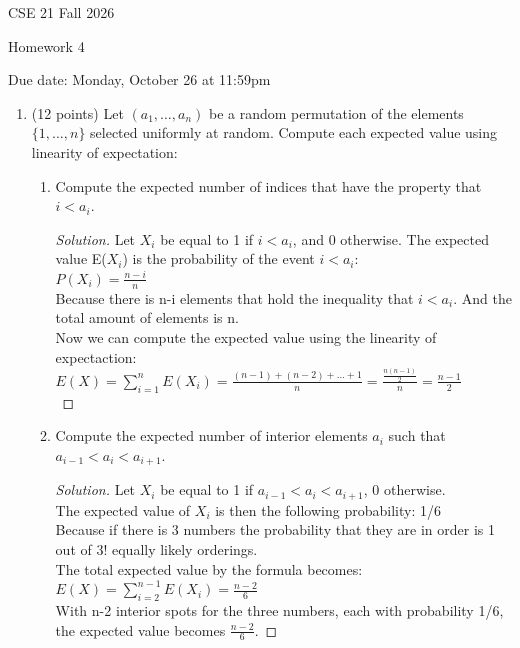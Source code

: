 \documentclass[10pt,letterpaper,unboxed,cm]{article}
\newenvironment{solution}
  {\begin{proof}[Solution]}
  {\end{proof}}
\begin{document}
\hfill{CSE 21 Fall 2026}

\hfill{Homework 4}

\hfill{Due date: Monday, October 26 at 11:59pm}



\begin{enumerate}
\item (12 points)
Let $(a_1,\dots,a_n)$ be a random permutation of the elements $\{1,\dots,n\}$ selected uniformly at random. Compute each expected value using linearity of expectation:


\begin{enumerate}
\item
Compute the expected number of indices that have the property that $i<a_i$.

\begin{solution}
    Let $X_i$ be equal to 1 if $i < a_i$, and 0 otherwise. 
    The expected value E($X_i$) is the probability of the event $i < a_i$:\\
    \(P(X_i)=\frac{n-i}{n}\) \\
    Because there is n-i elements that hold the inequality that $i < a_i$. And the total amount of elements is n.\\
    Now we can compute the expected value using the linearity of expectaction:\\
    \(E(X) = \sum_{i=1}^{n} E(X_i) = \frac{(n-1)+(n-2)+\dots+1}{n} = \frac{\frac{n(n-1)}{2}}{n} = \boxed{\frac{n-1}{2}}\)\\
\end{solution}
\item
Compute the expected number of interior elements $a_i$ such that $a_{i-1}<a_i<a_{i+1}$.

\begin{solution}
    
    Let $X_i$ be equal to 1 if $a_{i-1} < a_i < a_{i+1}$, 0 otherwise.\\
    The expected value of $X_i$ is then the following probability: 1/6\\
    Because if there is 3 numbers the probability that they are in order is 1 out of 3! equally likely orderings.\\
    The total expected value by the formula becomes:\\
    \(E(X) = \sum_{i=2}^{n-1} E(X_i) = \boxed{\frac{n-2}{6}}\)\\
    With n-2 interior spots for the three numbers, each with probability 1/6, the expected value becomes $\frac{n-2}{6}$. 
\end{solution}


\end{enumerate}
\end{enumerate}
\end{document}
